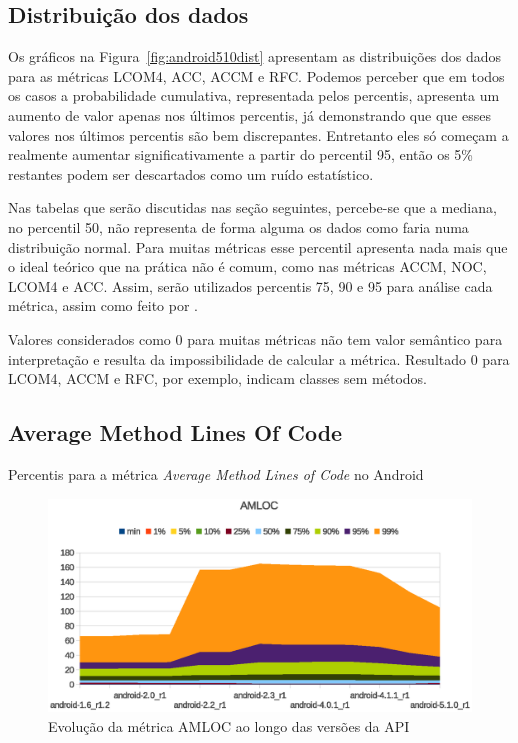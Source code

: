 \subsection{Distribuição dos dados}

Os gráficos na Figura~\ref{fig:android510dist} apresentam as distribuições dos dados para as métricas LCOM4, ACC, ACCM e RFC. Podemos perceber que em todos os casos a probabilidade cumulativa, representada pelos percentis, apresenta um aumento de valor apenas nos últimos percentis, já demonstrando que que esses valores nos últimos percentis são bem discrepantes. Entretanto eles só começam a realmente aumentar significativamente a partir do percentil 95, então os 5\% restantes podem ser descartados como um ruído estatístico. 

Nas tabelas que serão discutidas nas seção seguintes, percebe-se que a mediana, no percentil 50, não representa de forma alguma os dados como faria numa distribuição normal. Para muitas métricas esse percentil apresenta nada mais que o ideal teórico que na prática não é comum, como nas métricas ACCM, NOC, LCOM4 e ACC. Assim, serão utilizados percentis 75, 90 e 95 para análise cada métrica, assim como feito por .

Valores considerados como 0 para muitas métricas não tem valor semântico para interpretação e resulta da impossibilidade de calcular a métrica. Resultado 0 para LCOM4, ACCM e RFC, por exemplo, indicam classes sem métodos.

\subsection{Average Method Lines Of Code}

\begin{table}[!htb]
\centering
{}

\caption{Percentis para a métrica \textit{Average Method Lines of Code} no Android}
\label{tab:amloc_android}
\end{table}

\begin{figure}[!htb]
\centering
\includegraphics [keepaspectratio=true,scale=0.85]{figuras/graphs/amloc_android.eps}
\caption{Evolução da métrica AMLOC ao longo das versões da API}
\label{fig:amloc_android}
\end{figure}

